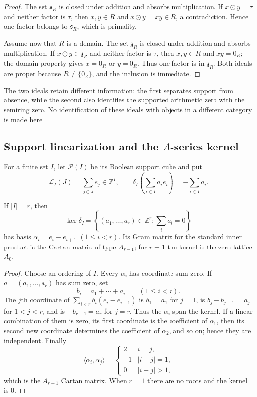\begin{proof}
The set $\mathfrak s_R$ is closed under addition and absorbs multiplication.
If $x\odot y=\tau$ and neither factor is $\tau$, then $x,y\in R$ and
$x\odot y=xy\in R$, a contradiction.  Hence one factor belongs to
$\mathfrak s_R$, which is primality.

Assume now that $R$ is a domain.  The set $\mathfrak z_R$ is closed under
addition and absorbs multiplication.  If $x\odot y\in\mathfrak z_R$ and
neither factor is $\tau$, then $x,y\in R$ and $xy=0_R$; the domain property
gives $x=0_R$ or $y=0_R$.  Thus one factor is in $\mathfrak z_R$.
Both ideals are proper because $R\ne\{0_R\}$, and the inclusion is immediate.
\end{proof}

The two ideals retain different information: the first separates support from
absence, while the second also identifies the supported arithmetic zero with
the semiring zero.  No identification of these ideals with objects in a
different category is made here.

\subsection{Support linearization and the $A$-series kernel}

For a finite set $I$, let $\mathcal P(I)$ be its Boolean support cube and put
\[
 \mathcal L_I(J)=\sum_{j\in J}e_j\in\mathbb Z^I,
 \qquad
 \delta_I\!\left(\sum_{i\in I}a_i e_i\right)=-\sum_{i\in I}a_i.
\]

\begin{theorem}
\label{thm:primitive-A-kernel}
If $|I|=r$, then
\[
 \ker\delta_I=\left\{(a_1,\ldots,a_r)\in\mathbb Z^r:
                    \sum_i a_i=0\right\}
\]
has basis $\alpha_i=e_i-e_{i+1}$ $(1\leq i<r)$.  Its Gram matrix for the
standard inner product is the Cartan matrix of type $A_{r-1}$; for $r=1$ the
kernel is the zero lattice $A_0$.
\end{theorem}

\begin{proof}
Choose an ordering of $I$.  Every $\alpha_i$ has coordinate sum zero.  If
$a=(a_1,\ldots,a_r)$ has sum zero, set
\[
 b_i=a_1+\cdots+a_i\qquad(1\leq i<r).
\]
The $j$th coordinate of $\sum_{i<r}b_i(e_i-e_{i+1})$ is $b_1=a_1$ for
$j=1$, is $b_j-b_{j-1}=a_j$ for $1<j<r$, and is
$-b_{r-1}=a_r$ for $j=r$.  Thus the $\alpha_i$ span the kernel.  If a linear
combination of them is zero, its first coordinate is the coefficient of
$\alpha_1$, then its second new coordinate determines the coefficient of
$\alpha_2$, and so on; hence they are independent.
Finally
\[
 \langle\alpha_i,\alpha_j\rangle=
 \begin{cases}2&i=j,\\-1&|i-j|=1,\\0&|i-j|>1,\end{cases}
\]
which is the $A_{r-1}$ Cartan matrix.  When $r=1$ there are no roots and the
kernel is $0$.
\end{proof}

